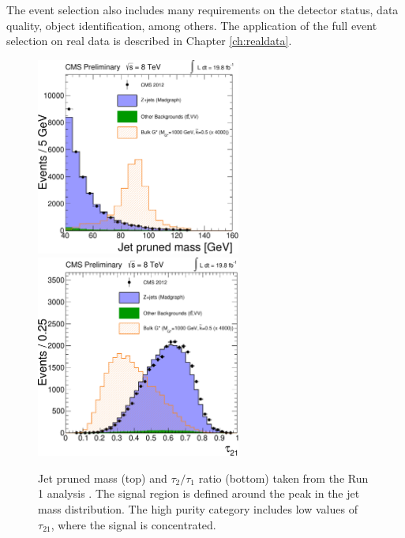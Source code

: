 The event selection also includes many requirements on the detector status, data quality, object identification, among others. The application of the full event selection on real data is described in Chapter \ref{ch:realdata}.


\begin{figure}[p]
\centering
\includegraphics[width=0.6\textwidth]{figures/objects/makePrunedMassPlotForPAS.pdf}\\\vspace{0.5cm}
\includegraphics[width=0.6\textwidth]{figures/objects/makeNSubjPlotForPAS.pdf}
\caption[Run 1 analysis]{Jet pruned mass (top) and $\tau_2/\tau_1$ ratio (bottom) taken from the Run 1 analysis \cite{CMS-PAS-EXO-12-022}. The signal region is defined around the peak in the jet mass distribution. The high purity category includes low values of $\tau_{21}$, where the signal is concentrated.}
\label{fig:run1plots}
\end{figure}


